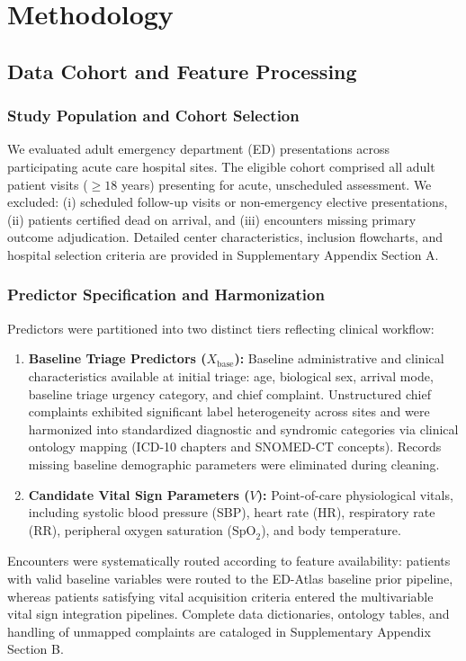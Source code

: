 \section{Methodology}
\label{sec:methodology}

\subsection{Data Cohort and Feature Processing}
\label{subsec:cohort}

\subsubsection{Study Population and Cohort Selection}
We evaluated adult emergency department (ED) presentations across participating acute care hospital sites. The eligible cohort comprised all adult patient visits ($\ge 18$ years) presenting for acute, unscheduled assessment. We excluded: (i) scheduled follow-up visits or non-emergency elective presentations, (ii) patients certified dead on arrival, and (iii) encounters missing primary outcome adjudication. Detailed center characteristics, inclusion flowcharts, and hospital selection criteria are provided in Supplementary Appendix Section A.

\subsubsection{Predictor Specification and Harmonization}
Predictors were partitioned into two distinct tiers reflecting clinical workflow:
\begin{enumerate}
    \item \textbf{Baseline Triage Predictors ($X_{\text{base}}$):} Baseline administrative and clinical characteristics available at initial triage: age, biological sex, arrival mode, baseline triage urgency category, and chief complaint. Unstructured chief complaints exhibited significant label heterogeneity across sites and were harmonized into standardized diagnostic and syndromic categories via clinical ontology mapping (ICD-10 chapters and SNOMED-CT concepts). Records missing baseline demographic parameters were eliminated during cleaning.
    \item \textbf{Candidate Vital Sign Parameters ($V$):} Point-of-care physiological vitals, including systolic blood pressure (SBP), heart rate (HR), respiratory rate (RR), peripheral oxygen saturation ($\text{SpO}_2$), and body temperature.
\end{enumerate}
Encounters were systematically routed according to feature availability: patients with valid baseline variables were routed to the ED-Atlas baseline prior pipeline, whereas patients satisfying vital acquisition criteria entered the multivariable vital sign integration pipelines. Complete data dictionaries, ontology tables, and handling of unmapped complaints are cataloged in Supplementary Appendix Section B.

